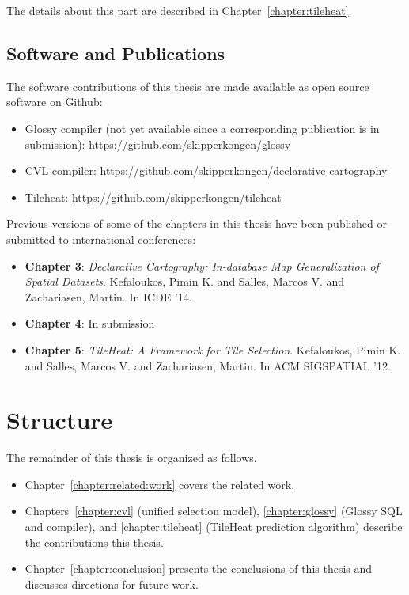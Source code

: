 \documentclass[11pt, oneside]{report}
\begin{document}
{The details about this part are described in Chapter~\ref{chapter:tileheat}.

\subsection{Software and Publications}

The software contributions of this thesis are made available as open source software on Github:

\begin{itemize}
\item Glossy compiler (not yet available since a corresponding publication is in submission): \url{https://github.com/skipperkongen/glossy}
\item CVL compiler: \url{https://github.com/skipperkongen/declarative-cartography}
\item Tileheat: \url{https://github.com/skipperkongen/tileheat}
\end{itemize}

Previous versions of some of the chapters in this thesis have been published or submitted to international conferences:

\begin{itemize}
\item \textbf{Chapter 3}: \emph{Declarative Cartography: In-database Map Generalization of Spatial Datasets}. Kefaloukos, Pimin K. and Salles, Marcos V.  and Zachariasen, Martin. In ICDE '14.
\item \textbf{Chapter 4}: In submission
\item \textbf{Chapter 5}: \emph{TileHeat: A Framework for Tile Selection}. Kefaloukos, Pimin K. and Salles, Marcos V.  and Zachariasen, Martin. In ACM SIGSPATIAL '12.
\end{itemize}

\section{Structure}
\label{sec:introduction:structure}


The remainder of this thesis is organized as follows. 
\begin{itemize}
\item Chapter~\ref{chapter:related:work} covers the related work.
\item Chapters~\ref{chapter:cvl} (unified selection model), \ref{chapter:glossy} (Glossy SQL and compiler), and \ref{chapter:tileheat} (TileHeat prediction algorithm) describe the contributions this thesis. 
\item Chapter~\ref{chapter:conclusion} presents the conclusions of this thesis and discusses directions for future work.
\end{itemize}

}
\end{document}
